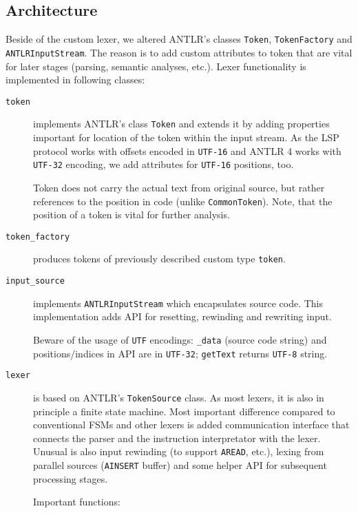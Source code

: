 \subsection{Architecture}
Beside of the custom lexer, we altered ANTLR's classes \texttt{Token}, \texttt{TokenFactory} and \texttt{ANTLRInputStream}. The reason is to add custom attributes to token that are vital for later stages (parsing, semantic analyses, etc.). Lexer functionality is implemented in following classes:

\begin{description}
	
		\item[\texttt{token}] implements ANTLR's class \texttt{Token} and extends it by adding properties important for location of the token within the input stream. As the LSP protocol works with offsets encoded in \texttt{UTF-16} and ANTLR 4 works with \texttt{UTF-32} encoding, we add attributes for \texttt{UTF-16} positions, too.
		
		Token does not carry the actual text from original source, but rather references to the position in code (unlike \texttt{CommonToken}). Note, that the position of a token is vital for further analysis.
		
		\item[\texttt{token\_factory}] produces tokens of previously described custom type \texttt{token}.
		
		\item[\texttt{input\_source}] implements \texttt{ANTLRInputStream} which encapsulates source code. This implementation adds API for resetting, rewinding and rewriting input. 
		
		Beware of the usage of \texttt{UTF} encodings: \texttt{\_data} (source code string) and positions/indices in API are in \texttt{UTF-32}; \texttt{getText} returns \texttt{UTF-8} string.
		
		\item[\texttt{lexer}] is based on ANTLR's \texttt{TokenSource} class. As most lexers, it is also in principle a finite state machine. Most important difference compared to conventional FSMs and other lexers is added communication interface that connects the parser and the instruction interpretator with the lexer. Unusual is also input rewinding (to support \texttt{AREAD}, etc.), lexing from parallel sources (\texttt{AINSERT} buffer) and some helper API for subsequent processing stages.
		
		Important functions:
		

\end{description}
